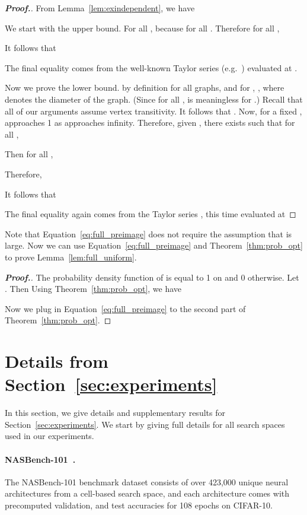 \documentclass[11pt]{article}
\let\citep\cite
\numberwithin{equation}{section}
\numberwithin{figure}{section}
\theoremstyle{plain}
\theoremstyle{definition}
\begin{document}
\begin{proof}[\textbf{Proof.}]
From Lemma~\ref{lem:exindependent},
we have 


We start with the upper bound.
For all , 
because  for all .
Therefore for all ,


It follows that

The final equality comes from the well-known Taylor
series  
(e.g.\ \citep{abramowitz1948handbook}) evaluated at .

Now we prove the lower bound.
 by definition for all graphs, and for ,
, where  denotes the diameter of the graph.
(Since  for all ,  is meaningless for .)
Recall that all of our arguments assume vertex transitivity.
It follows that .
Now, for a fixed ,  approaches 1 as  approaches infinity. 
Therefore, given , there exists  such that for all ,

Then for all ,


Therefore,


It follows that

The final equality again comes from the Taylor series , 
this time evaluated at 
\end{proof}

Note that Equation~\ref{eq:full_preimage} does not require the assumption
that  is large. Now we can use Equation~\ref{eq:full_preimage} and
Theorem~\ref{thm:prob_opt} to prove Lemma~\ref{lem:full_uniform}.

\fulluniform*

\begin{proof}[\textbf{Proof.}]

The probability density function of  is equal to 1 on  and 0 otherwise.
Let .
Then 
Using Theorem~\ref{thm:prob_opt},
we have 


Now we plug in Equation~\ref{eq:full_preimage}
to the second part of Theorem~\ref{thm:prob_opt}.

\end{proof} 
\section{Details from Section~\ref{sec:experiments}} \label{app:experiments}

In this section, we give details and supplementary results for Section~\ref{sec:experiments}.
We start by giving full details for all search spaces used in our experiments.

\paragraph{NASBench-101~\citep{nasbench}.}
The NASBench-101 benchmark dataset consists of over 423,000 
unique neural architectures from a cell-based search space,
and each architecture comes with precomputed validation, 
and test accuracies for 108 epochs on CIFAR-10. 
\end{document}
